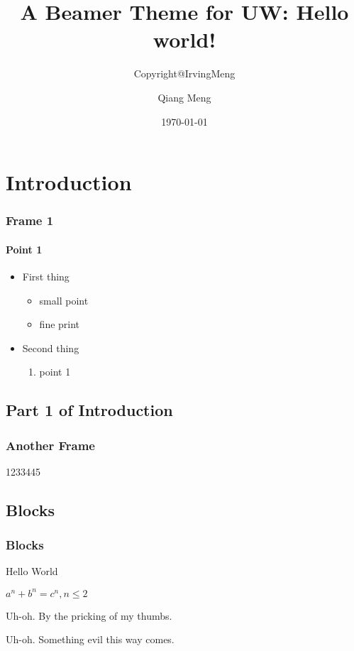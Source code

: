 \documentclass{beamer}
\title{A Beamer Theme for UW: Hello world!}
\subtitle{Copyright@IrvingMeng}
\author{Qiang Meng}
\date{\today}
\institute{University of Washington}
\begin{document}
\begin{frame}[plain,t]
\titlepage
\end{frame}


\section{Introduction}
\begin{frame}
\frametitle{Frame 1}
\framesubtitle{Point 1}
\begin{itemize}
\item First thing
	\begin{itemize}
	\item small point
	\item fine print
	\end{itemize}
\item Second thing
	\begin{enumerate}
	\item point 1
	\end{enumerate}
\end{itemize}
\end{frame}

\subsection{Part 1 of Introduction}
\begin{frame}
\frametitle{Another Frame}
1233445
\end{frame}

\subsection{Blocks}
\begin{frame}
\frametitle{Blocks}
\begin{definition}[Greetings]
Hello World
\end{definition}

\begin{theorem}
$a^n + b^n = c^n, n \leq 2$
\end{theorem}

\begin{alertblock}{Uh-oh.}
By the pricking of my thumbs.
\end{alertblock}
\begin{exampleblock}{Uh-oh.}
Something evil this way comes.
\end{exampleblock}

\end{frame}

\ThankYouFrame
\end{document}
